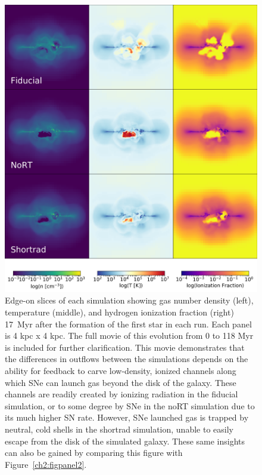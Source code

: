 \begin{figure}
\centering
\includegraphics[width=0.99\linewidth]{figures/ch2/DD0136_fiducial_shortrad_nort}
\caption{Edge-on slices of each simulation showing gas number density (left), temperature (middle), and hydrogen ionization fraction (right) 17~Myr after the formation of the first star in each run. Each panel is 4 kpc x 4 kpc. The full movie of this evolution from 0 to 118 Myr is included for further clarification. This movie demonstrates that the differences in outflows between the simulations depends on the ability for feedback to carve low-density, ionized channels along which SNe can launch gas beyond the disk of the galaxy. These channels are readily created by ionizing radiation in the fiducial simulation, or to some degree by SNe in the noRT simulation due to its much higher SN rate. However, SNe launched gas is trapped by neutral, cold shells in the shortrad simulation, unable to easily escape from the disk of the simulated galaxy. These same insights can also be gained by comparing this figure with Figure~\ref{ch2:figpanel2}.}
\label{ch2:figpanel1}
\end{figure}

